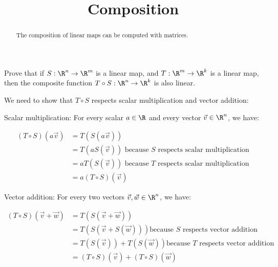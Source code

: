 \documentclass{ximera}
\title{Composition}
\begin{document}
\begin{abstract}
  The composition of linear maps can be computed with matrices.
\end{abstract}

Prove that if $S:\R^n \to \R^m$ is a linear map, and $T:\R^m \to \R^k$ is a linear map, then the composite function $T\circ S:\R^n \to \R^k$ is also linear.
  
\begin{free-response}
	We need to show that $T \circ S$ respects scalar multiplication and vector addition:
	
	Scalar multiplication:
	For every scalar $a \in \R$ and every vector $\vec{v} \in \R^n$, we have:
	
	\begin{align*}	
		(T\circ S)(a\vec{v}) &= T\left(S(a\vec{v})\right)\\
		&= T(aS(\vec{v})) \text{ because $S$ respects scalar multiplication}\\
		&= aT(S(\vec{v})) \text{ because $T$ respects scalar multiplication}\\
		&=a(T \circ S)(\vec{v})
	\end{align*}
	
	Vector addition:
	For every two vectors $\vec{v},\vec{w} \in \R^n$, we have:
		
		\begin{align*}
			(T \circ S)(\vec{v}+\vec{w}) &= T\left(S(\vec{v}+\vec{w})\right) \\
			&= T(S(\vec{v}+S(\vec{w}))) \text{because $S$ respects vector addition}\\
			&= T(S(\vec{v}))+T(S(\vec{w})) \text{because $T$ respects vector addition}\\
			&= (T \circ S)(\vec{v})+(T\circ S)(\vec{w})
		\end{align*}
\end{free-response}
	
\end{document}
